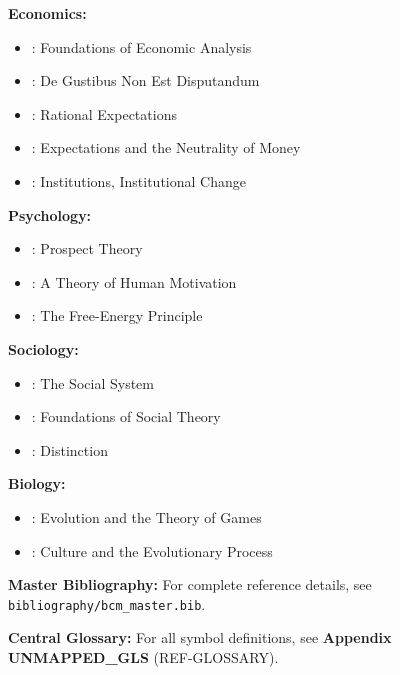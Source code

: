 \textbf{Economics:}
\begin{itemize}[nosep]
    \item \citet{samuelson1947}: Foundations of Economic Analysis
    \item \citet{stiglerbecker1977}: De Gustibus Non Est Disputandum
    \item \citet{muth1961}: Rational Expectations
    \item \citet{lucas1972}: Expectations and the Neutrality of Money
    \item \citet{north1990institutions}: Institutions, Institutional Change
\end{itemize}

\textbf{Psychology:}
\begin{itemize}[nosep]
    \item \citet{kahnemantversky1979}: Prospect Theory
    \item \citet{maslow1943}: A Theory of Human Motivation
    \item \citet{friston2010}: The Free-Energy Principle
\end{itemize}

\textbf{Sociology:}
\begin{itemize}[nosep]
    \item \citet{parsons1951}: The Social System
    \item \citet{coleman1990}: Foundations of Social Theory
    \item \citet{bourdieu1984}: Distinction
\end{itemize}

\textbf{Biology:}
\begin{itemize}[nosep]
    \item \citet{maynardsmith1982}: Evolution and the Theory of Games
    \item \citet{boydricherson}: Culture and the Evolutionary Process
\end{itemize}

\begin{tcolorbox}[colback=blue!5!white, colframe=blue!75!black]
\textbf{Master Bibliography:} For complete reference details, see
\texttt{bibliography/bcm\_master.bib}.

\textbf{Central Glossary:} For all symbol definitions, see
\textbf{Appendix UNMAPPED_GLS} (REF-GLOSSARY).
\end{tcolorbox}



